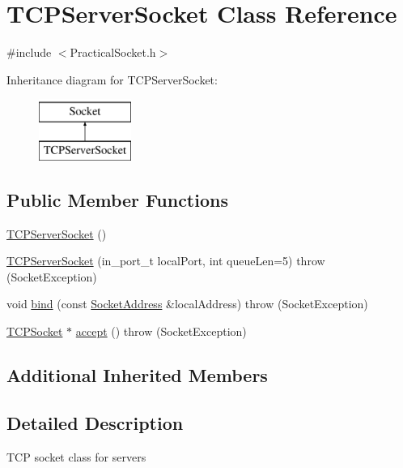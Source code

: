 \hypertarget{class_t_c_p_server_socket}{}\section{T\+C\+P\+Server\+Socket Class Reference}
\label{class_t_c_p_server_socket}


{\ttfamily \#include $<$Practical\+Socket.\+h$>$}

Inheritance diagram for T\+C\+P\+Server\+Socket\+:\begin{figure}[H]
\begin{center}
\leavevmode
\includegraphics[height=2.000000cm]{class_t_c_p_server_socket}
\end{center}
\end{figure}
\subsection*{Public Member Functions}
\begin{DoxyCompactItemize}
\item 
\hyperlink{class_t_c_p_server_socket_afd6db7f0517bd854cdac2244dcda90d0}{T\+C\+P\+Server\+Socket} ()
\item 
\hyperlink{class_t_c_p_server_socket_a830f753522bbc74bd8b2bf28e528ab69}{T\+C\+P\+Server\+Socket} (in\+\_\+port\+\_\+t local\+Port, int queue\+Len=5)  throw (\+Socket\+Exception)
\item 
void \hyperlink{class_t_c_p_server_socket_a779d077e4dd9a885ce06fdceff63baa4}{bind} (const \hyperlink{class_socket_address}{Socket\+Address} \&local\+Address)  throw (\+Socket\+Exception)
\item 
\hyperlink{class_t_c_p_socket}{T\+C\+P\+Socket} $\ast$ \hyperlink{class_t_c_p_server_socket_a1d161137e1b069de7a7bfc14d3f8212c}{accept} ()  throw (\+Socket\+Exception)
\end{DoxyCompactItemize}
\subsection*{Additional Inherited Members}


\subsection{Detailed Description}
T\+CP socket class for servers 


